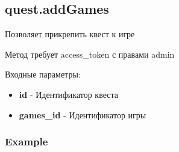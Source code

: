 \subsection{quest.addGames}

Позволяет прикрепить квест к игре

Метод требует access\_token с правами admin

Входные параметры:
\begin{itemize}
  \item \textbf{id} - Идентификатор квеста
  \item \textbf{games\_id} - Идентификатор игры
\end{itemize}

\subsubsection{Example}
\begin{Verbatim}[frame=single]

\end{Verbatim}
